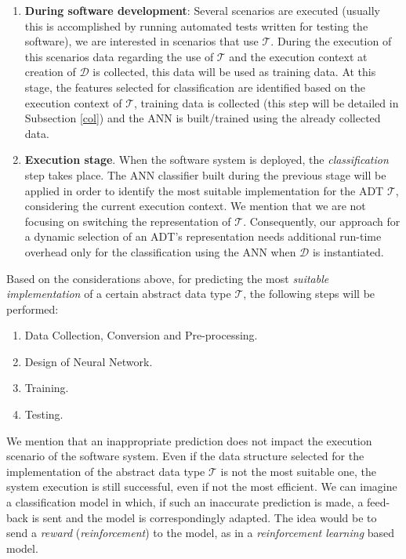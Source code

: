 \begin{enumerate}

\item  \textbf{During software development}: Several scenarios are executed (usually this is accomplished by running automated tests written for testing the software), we are interested in scenarios that use  $\mathcal{T}$. During the execution of this scenarios data regarding the use of  $\mathcal{T}$  and the execution context at creation of $\mathcal{D}$ is collected, this data will be used as training data. At this stage, the features selected for classification are identified based on the execution context of $\mathcal{T}$,  training data is collected (this step will be detailed in Subsection \ref{col})  and the ANN is built/trained using the already collected data.

\item  \textbf{Execution stage}. When the software system is deployed, the \emph{classification} step takes place.  The ANN classifier built during the previous stage will be applied in order to identify the most suitable implementation for the ADT $\mathcal{T}$, considering the current execution context.  We mention that we are not focusing on switching the representation of $\mathcal{T}$. Consequently, our approach for a dynamic selection of an ADT's representation needs additional run-time overhead only for the classification using the ANN when $\mathcal{D}$ is instantiated.
\end{enumerate}

Based on the considerations above,  for predicting the most \emph{suitable implementation} of a certain abstract data type $\mathcal{T}$, the following steps will be performed:

\begin{enumerate}

\item Data Collection, Conversion and Pre-processing.

\item Design of Neural Network.

\item Training.

\item Testing.

\end{enumerate}

We mention that an inappropriate prediction does not impact the execution scenario of the software system. Even if the data structure selected for the implementation of the abstract data type $\mathcal{T}$ is not the most suitable one, the system execution is still successful, even if not the most efficient. We can imagine a classification model in which, if such an inaccurate prediction is made, a feed-back is sent and the model is correspondingly adapted. The idea would be to send a \emph{reward} (\emph{reinforcement}) to the model, as in a \emph{reinforcement learning} \cite{sutton} based model.

